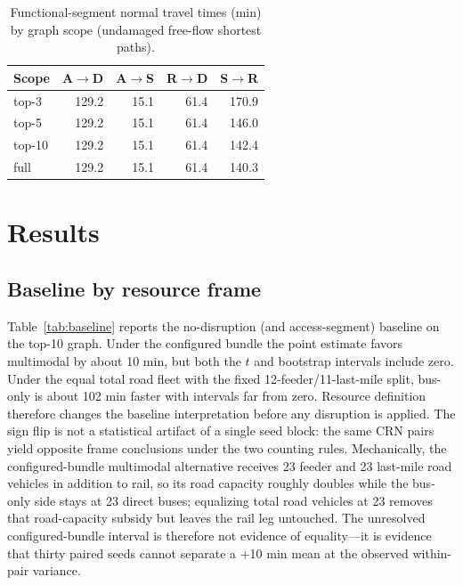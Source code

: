 \documentclass{ieeeaccess}
\begin{document}
\begin{table}[!t]
\caption{Functional-segment normal travel times (min) by graph scope (undamaged free-flow shortest paths).}
\label{tab:legtimes}
\centering
\footnotesize
\begin{tabular}{@{}lrrrr@{}}
\hline
Scope & A$\rightarrow$D & A$\rightarrow$S & R$\rightarrow$D & S$\rightarrow$R \\
\hline
top-3 & 129.2 & 15.1 & 61.4 & 170.9 \\
top-5 & 129.2 & 15.1 & 61.4 & 146.0 \\
top-10 & 129.2 & 15.1 & 61.4 & 142.4 \\
full & 129.2 & 15.1 & 61.4 & 140.3 \\
\hline
\end{tabular}
\end{table}

\section{Results}
\label{sec:results}

\subsection{Baseline by resource frame}
Table~\ref{tab:baseline} reports the no-disruption (and access-segment) baseline on the top-10 graph. Under the configured bundle the point estimate favors multimodal by about 10 min, but both the $t$ and bootstrap intervals include zero. Under the equal total road fleet with the fixed 12-feeder/11-last-mile split, bus-only is about 102 min faster with intervals far from zero. Resource definition therefore changes the baseline interpretation before any disruption is applied. The sign flip is not a statistical artifact of a single seed block: the same CRN pairs yield opposite frame conclusions under the two counting rules. Mechanically, the configured-bundle multimodal alternative receives 23 feeder and 23 last-mile road vehicles in addition to rail, so its road capacity roughly doubles while the bus-only side stays at 23 direct buses; equalizing total road vehicles at 23 removes that road-capacity subsidy but leaves the rail leg untouched. The unresolved configured-bundle interval is therefore not evidence of equality---it is evidence that thirty paired seeds cannot separate a +10 min mean at the observed within-pair variance.
\end{document}
